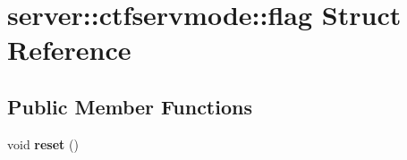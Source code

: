 \hypertarget{structserver_1_1ctfservmode_1_1flag}{}\section{server\+:\+:ctfservmode\+:\+:flag Struct Reference}
\label{structserver_1_1ctfservmode_1_1flag}
\subsection*{Public Member Functions}
\begin{DoxyCompactItemize}
\item 
\mbox{\label{structserver_1_1ctfservmode_1_1flag_a015a8047e69ef53858188c04de595d84}} 
void {\bfseries reset} ()
\end{DoxyCompactItemize}
